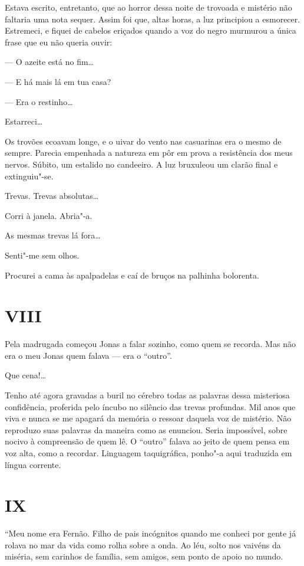 Estava escrito, entretanto, que ao horror dessa noite de trovoada e
mistério não faltaria uma nota sequer. Assim foi que, altas horas, a luz
principiou a esmorecer. Estremeci, e fiquei de cabelos eriçados quando a
voz do negro murmurou a única frase que eu não queria ouvir:

--- O azeite está no fim\ldots{}

--- E há mais lá em tua casa?

--- Era o restinho\ldots{}

Estarreci\ldots{}

Os trovões ecoavam longe, e o uivar do vento nas casuarinas era o mesmo
de sempre. Parecia empenhada a natureza em pôr em prova a resistência
dos meus nervos. Súbito, um estalido no candeeiro. A luz bruxuleou um
clarão final e extinguiu"-se.

Trevas. Trevas absolutas\ldots{}

Corri à janela. Abria"-a.

As mesmas trevas lá fora\ldots{}

Senti"-me sem olhos.

Procurei a cama às apalpadelas e caí de bruços na palhinha bolorenta.

\section*{VIII}

Pela madrugada começou Jonas a falar sozinho, como quem se recorda. Mas
não era o meu Jonas quem falava --- era o ``outro''.

Que cena!\ldots{}

Tenho até agora gravadas a buril no cérebro todas as palavras dessa
misteriosa confidência, proferida pelo íncubo no silêncio das trevas
profundas. Mil anos que viva e nunca se me apagará da memória o ressoar
daquela voz de mistério. Não reproduzo suas palavras da maneira como as
enunciou. Seria impossível, sobre nocivo à compreensão de quem lê. O
``outro'' falava ao jeito de quem pensa em voz alta, como a recordar.
Linguagem taquigráfica, ponho"-a aqui traduzida em língua corrente.

\section*{IX}

``Meu nome era Fernão. Filho de pais incógnitos quando me conheci por
gente já rolava no mar da vida como rolha sobre a onda. Ao léu, solto
nos vaivéns da miséria, sem carinhos de família, sem amigos, sem ponto
de apoio no mundo.

